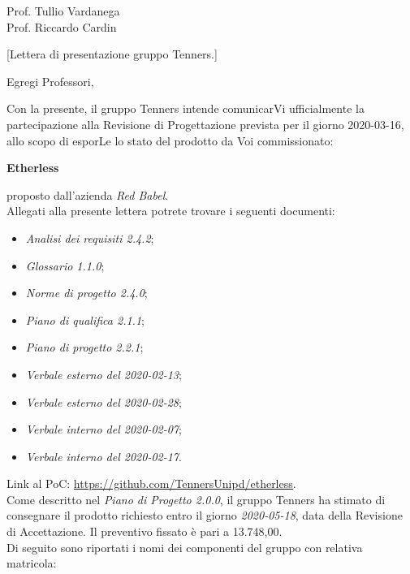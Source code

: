 \begin{letter}{\begin{flushright}
			Prof. Tullio Vardanega \\
			Prof. Riccardo Cardin 
	\end{flushright}}[Lettera di presentazione gruppo Tenners.]
\opening[Padova, ]{Egregi Professori,}
	\noindent Con la presente, il gruppo Tenners intende comunicarVi ufficialmente la partecipazione alla Revisione di Progettazione prevista per il giorno 2020-03-16, allo scopo di esporLe lo stato del prodotto da Voi commissionato:
	\begin{center}
		\textbf{Etherless}
	\end{center}
    proposto dall'azienda \textit{Red Babel}. \\
    \noindent Allegati alla presente lettera potrete trovare i seguenti documenti:
    \begin{itemize}
    	\item \textit{Analisi dei requisiti 2.4.2\docs};
    	\item \textit{Glossario 1.1.0\docs};
    	\item \textit{Norme di progetto 2.4.0\docs};
    	\item \textit{Piano di qualifica 2.1.1\docs};
    	\item \textit{Piano di progetto 2.2.1\docs};
    	\item \textit{Verbale esterno del 2020-02-13\docs};
    	\item \textit{Verbale esterno del 2020-02-28\docs};
    	\item \textit{Verbale interno del 2020-02-07\docs};
    	\item \textit{Verbale interno del 2020-02-17\docs}.
    \end{itemize}
	Link al PoC: \url{https://github.com/TennersUnipd/etherless}.\\
    \noindent Come descritto nel \textit{Piano di Progetto 2.0.0}\docs, il gruppo Tenners ha stimato di consegnare il prodotto richiesto entro il giorno \textit{2020-05-18}, data della Revisione di Accettazione. Il preventivo fissato è pari a 13.748,00\officialeuro.\\ 
    \noindent Di seguito sono riportati i nomi dei componenti del gruppo con relativa matricola:
    \begin{center}
    	\renewcommand{\arraystretch}{1.8}
    	

\end{center}
\end{letter}
